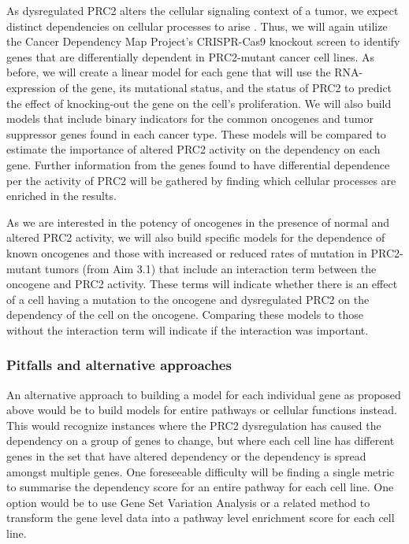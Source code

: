 As dysregulated PRC2 alters the cellular signaling context of a tumor, we expect distinct dependencies on cellular processes to arise \cite{Kim2015SWI/SNF-mutantEZH2., Fillmore2015EZH2Inhibitors., Serresi2016PolycombCancer., Serresi2018Ezh2Vulnerabilities., Chen2018TargetingMedicine.}.
Thus, we will again utilize the Cancer Dependency Map Project's CRISPR-Cas9 knockout screen \cite{Tsherniak2017, Meyers2017} to identify genes that are differentially dependent in PRC2-mutant cancer cell lines.
As before, we will create a linear model for each gene that will use the RNA-expression of the gene, its mutational status, and the status of PRC2 to predict the effect of knocking-out the gene on the cell's proliferation.
We will also build models that include binary indicators for the common oncogenes and tumor suppressor genes found in each cancer type.
These models will be compared to estimate the importance of altered PRC2 activity on the dependency on each gene.
Further information from the genes found to have differential dependence per the activity of PRC2 will be gathered by finding which cellular processes are enriched in the results.

As we are interested in the potency of oncogenes in the presence of normal and altered PRC2 activity, we will also build specific models for the dependence of known oncogenes and those with increased or reduced rates of mutation in PRC2-mutant tumors (from Aim 3.1) that include an interaction term between the oncogene and PRC2 activity.
These terms will indicate whether there is an effect of a cell having a mutation to the oncogene and dysregulated PRC2 on the dependency of the cell on the oncogene.
Comparing these models to those without the interaction term will indicate if the interaction was important.


\subsubsection*{Pitfalls and alternative approaches}

An alternative approach to building a model for each individual gene as proposed above would be to build models for entire pathways or cellular functions instead.
This would recognize instances where the PRC2 dysregulation has caused the dependency on a group of genes to change, but where each cell line has different genes in the set that have altered dependency or the dependency is spread amongst multiple genes.
One foreseeable difficulty will be finding a single metric to summarise the dependency score for an entire pathway for each cell line.
One option would be to use Gene Set Variation Analysis \cite{Hanzelmann2013} or a related method \cite{Barbie2009, Lee2008InferringClassification., Tomfohr2005PathwayDecomposition., Jung2011ComparisonGenes.} to transform the gene level data into a pathway level enrichment score for each cell line.


